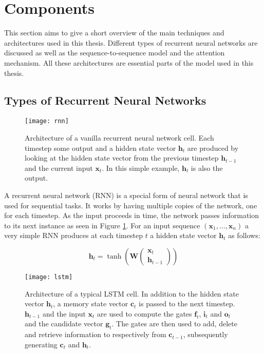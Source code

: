 \section{Components}

This section aims to give a short overview of the main techniques and architectures used in this thesis. Different types of recurrent neural networks are discussed as well as the sequence-to-sequence model and the attention mechanism. All these architectures are essential parts of the model used in this thesis.

\subsection{Types of Recurrent Neural Networks}
\label{rnn_types}

\begin{figure}[p]
\centering
\texttt{[image: rnn]}
\caption{Architecture of a vanilla recurrent neural network cell. Each timestep some output and a hidden state vector \(\mathbf{h}_t\) are produced by looking at the hidden state vector from the previous timestep \(\mathbf{h}_{t-1}\) and the current input \(\mathbf{x}_t\). In this simple example, \(\mathbf{h}_t\) is also the output.}
\label{rnn}
\end{figure}

A recurrent neural network (RNN)\cite{rnn} is a special form of neural network that is used for sequential tasks. It works by having multiple copies of the network, one for each timestep. As the input proceeds in time, the network passes information to its next instance as seen in Figure \ref{rnn}. For an input sequence \((\mathbf{x}_1, ..., \mathbf{x}_n)\) a very simple RNN produces at each timestep \(t\) a hidden state vector \(\mathbf{h}_t\) as follows:

\begin{equation*}
  \mathbf{h}_t = \tanh \left(\mathbf{W} \begin{pmatrix} \mathbf{x}_t \\ \mathbf{h}_{t-1} \end{pmatrix} \right)
\end{equation*}

\begin{figure}[p]
\centering
\texttt{[image: lstm]}
\caption{Architecture of a typical LSTM cell. In addition to the hidden state vector \(\mathbf{h}_t\), a memory state vector \(\mathbf{c}_t\) is passed to the next timestep. \(\mathbf{h}_{t-1}\) and the input \(\mathbf{x}_t\) are used to compute the gates \(\mathbf{f}_t\), \(\mathbf{i}_t\) and \(\mathbf{o}_t\) and the candidate vector \(\mathbf{g}_t\). The gates are then used to add, delete and retrieve information to respectively from \(\mathbf{c}_{t-1}\), subsequently generating \(\mathbf{c}_t\) and \(\mathbf{h}_t\).}
\label{lstm}
\end{figure}


